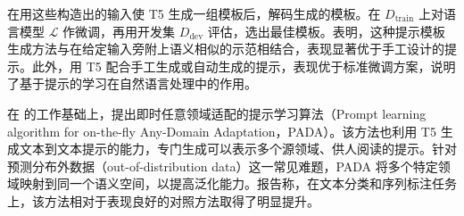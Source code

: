 
在用这些构造出的输入使 T5 生成一组模板后，解码生成的模板。在 $D_{\mathrm{train}}$ 上对语言模型 $\mathcal{L}$ 作微调，再用开发集 $D_{\mathrm{dev}}$ 评估，选出最佳模板。表明，这种提示模板生成方法与在给定输入旁附上语义相似的示范相结合，表现显著优于手工设计的提示。此外，用 T5 配合手工生成或自动生成的提示，表现优于标准微调方案，说明了基于提示的学习在自然语言处理中的作用。

在 的工作基础上，提出即时任意领域适配的提示学习算法（Prompt learning algorithm for on-the-fly Any-Domain Adaptation，PADA）。该方法也利用 T5 生成文本到文本提示的能力，专门生成可以表示多个源领域、供人阅读的提示。针对预测分布外数据（out-of-distribution data）这一常见难题，PADA 将多个特定领域映射到同一个语义空间，以提高泛化能力。报告称，在文本分类和序列标注任务上，该方法相对于表现良好的对照方法取得了明显提升。


